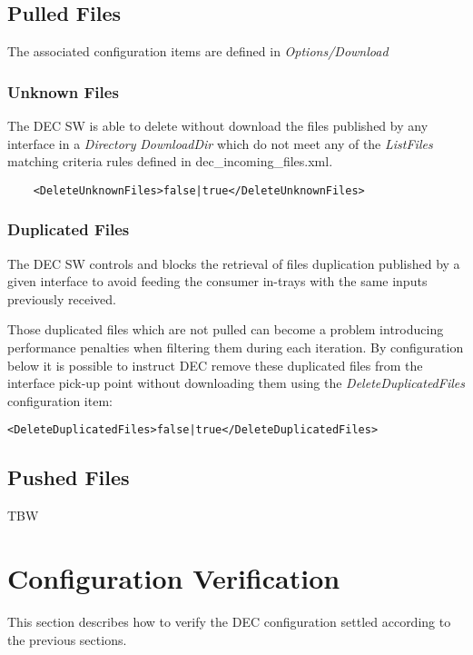 \documentclass[dec_sum_main.tex]{subfiles}
\begin{document}
\subsection{Pulled Files}
The associated configuration items are defined in \textit{Options/Download}

\subsubsection{Unknown Files}
The DEC SW is able to delete without download the files published by any interface in a \textit{Directory} \textit{DownloadDir} which do not meet any of the \textit{ListFiles} matching criteria rules defined in dec\_incoming\_files.xml. 

\label{DeleteUnknownFiles}
\begin{verbatim}
	<DeleteUnknownFiles>false|true</DeleteUnknownFiles>
\end{verbatim}

\subsubsection{Duplicated Files}
The DEC SW controls and blocks the retrieval of files duplication published by a given interface to avoid feeding the consumer in-trays with the same inputs previously received.\newline
\par
\noindent
Those duplicated files which are not pulled can become a problem introducing performance penalties when filtering them during each iteration.
By configuration below it is possible to instruct DEC remove these duplicated files from the interface pick-up point without downloading them using the \textit{DeleteDuplicatedFiles} configuration item:
\label{DeleteDuplicatedFiles}
\begin{verbatim}
<DeleteDuplicatedFiles>false|true</DeleteDuplicatedFiles>
\end{verbatim}

\subsection{Pushed Files}
TBW


\section{Configuration Verification}
This section describes how to verify the DEC configuration settled according to the previous sections. 
\end{document}
